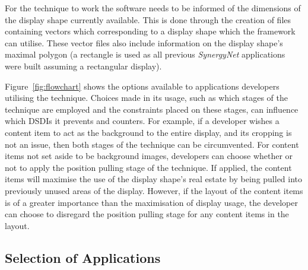 \documentclass[twocolumn,compsoc]{cvm}
\begin{document}
For the technique to work the software needs to be informed of the dimensions of the display shape currently available.
This is done through the creation of files containing vectors which corresponding to a display shape which the framework can utilise.
These vector files also include information on the display shape's maximal polygon (a rectangle is used as all previous {\emph{SynergyNet}} applications were built assuming a rectangular display).

Figure~\ref{fig:flowchart} shows the options available to applications developers utilising the technique.
Choices made in its usage, such as which stages of the technique are employed and the constraints placed on these stages, can influence which \acp{DSDI} it prevents and counters.
For example, if a developer wishes a content item to act as the background to the entire display, and its cropping is not an issue, then both stages of the technique can be circumvented.
For content items not set aside to be background images, developers can choose whether or not to apply the position pulling stage of the technique.
If applied, the content items will maximise the use of the display shape's real estate by being pulled into previously unused areas of the display.
However, if the layout of the content items is of a greater importance than the maximisation of display usage, the developer can choose to disregard the position pulling stage for any content items in the layout.


\subsection{Selection of Applications}
\label{subsec:selectionofapplications} 
\end{document}
